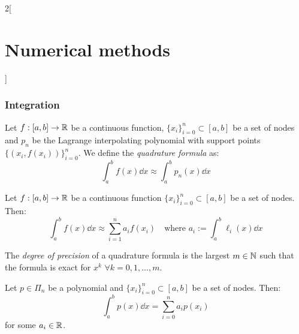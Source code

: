\documentclass[../../../main.tex]{subfiles}
\begin{document}
\begin{multicols}{2}[\section{Numerical methods}]
\subsubsection*{Integration}
\begin{definition}
    Let $f:[a,b]\rightarrow\mathbb{R}$ be a continuous function, $\{x_i\}_{i=0}^n\subset[a,b]$ be a set of nodes and $p_n$ be the Lagrange interpolating polynomial with support points $\{(x_i,f(x_i))\}_{i=0}^n$. We define the \textit{quadrature formula} as: $$\int_a^bf(x)\dd x\approx\int_a^bp_n(x)\dd x$$
\end{definition}
\begin{lemma}
    Let $f:[a,b]\rightarrow\mathbb{R}$ be a continuous function $\{x_i\}_{i=0}^n\subset[a,b]$ be a set of nodes. Then: $$\int_a^bf(x)\dd x\approx\sum_{i=1}^na_if(x_i)\quad\text{where }a_i:=\int_a^b\ell_i(x)\dd x$$
\end{lemma}
\begin{definition}
    The \textit{degree of precision} of a quadrature formula is the largest $m\in\mathbb{N}$ such that the formula is exact for $x^k$ $\forall k=0,1,\ldots,m$.
\end{definition}
\begin{lemma}
    Let $p\in\Pi_n$ be a polynomial and $\{x_i\}_{i=0}^n\subset[a,b]$ be a set of nodes. Then: $$\int_a^bp(x)\dd x=\sum_{i=0}^na_ip(x_i)$$ for some $a_i\in\mathbb{R}$.
\end{lemma}

\end{multicols}
\end{document}
